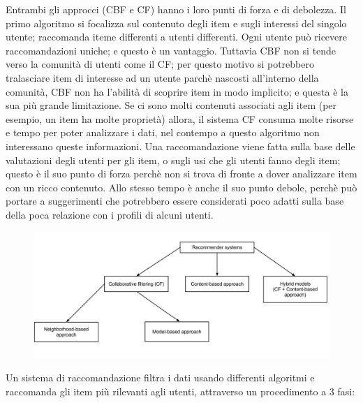 Entrambi gli approcci (CBF e CF) hanno i loro punti di forza e di debolezza. Il primo algoritmo si focalizza sul contenuto degli item e
sugli interessi del singolo utente; raccomanda iteme differenti a utenti differenti. Ogni utente può ricevere raccomandazioni uniche; e 
questo è un vantaggio. Tuttavia CBF non si tende verso la comunità di utenti come il CF; per questo motivo si potrebbero tralasciare 
item di interesse ad un utente parchè nascosti all'interno della comunità, CBF non ha l'abilità di scoprire item in modo implicito; e 
questa è la sua più grande limitazione.
Se ci sono molti contenuti associati agli item (per esempio, un item ha molte proprietà) allora, il sistema CF consuma molte risorse e 
tempo per poter analizzare i dati, nel contempo a questo algoritmo non interessano queste informazioni. Una raccomandazione viene fatta
sulla base delle valutazioni degli utenti per gli item, o sugli usi che gli utenti fanno degli item; questo è il suo punto di forza 
perchè non si trova di fronte a dover analizzare item con un ricco contenuto. Allo stesso tempo è anche il suo punto debole, perchè può
portare a suggerimenti che potrebbero essere considerati poco adatti sulla base della poca relazione con i profili di alcuni utenti.

\begin{figure}[ht!]
	\centering
	\includegraphics[scale=0.5]{images/recommender_systems.jpg}
	\caption{}
	\label{fig:RS}
\end{figure}


\cite{model-based-approach-for-collaborative-filtering}
Un sistema di raccomandazione filtra i dati usando differenti algoritmi e raccomanda gli item più rilevanti agli utenti,
attraverso un procedimento a 3 fasi:

